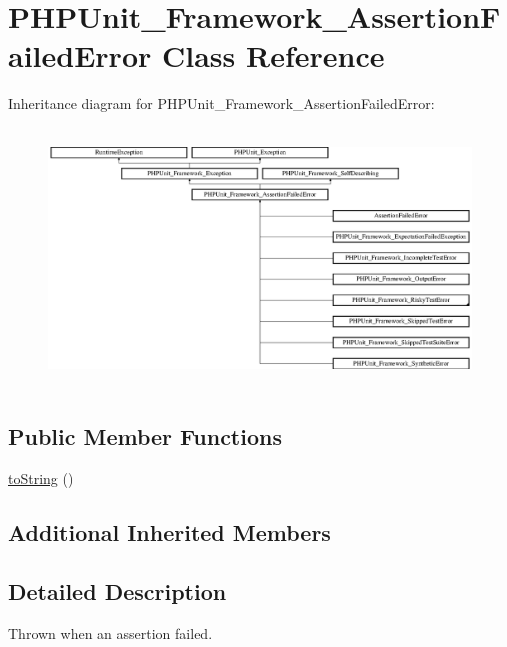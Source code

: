 \hypertarget{class_p_h_p_unit___framework___assertion_failed_error}{}\section{P\+H\+P\+Unit\+\_\+\+Framework\+\_\+\+Assertion\+Failed\+Error Class Reference}
\label{class_p_h_p_unit___framework___assertion_failed_error}
Inheritance diagram for P\+H\+P\+Unit\+\_\+\+Framework\+\_\+\+Assertion\+Failed\+Error\+:\begin{figure}[H]
\begin{center}
\leavevmode
\includegraphics[height=6.890380cm]{class_p_h_p_unit___framework___assertion_failed_error}
\end{center}
\end{figure}
\subsection*{Public Member Functions}
\begin{DoxyCompactItemize}
\item 
\mbox{\hyperlink{class_p_h_p_unit___framework___assertion_failed_error_a5558c5d549f41597377fa1ea8a1cefa3}{to\+String}} ()
\end{DoxyCompactItemize}
\subsection*{Additional Inherited Members}


\subsection{Detailed Description}
Thrown when an assertion failed. 

